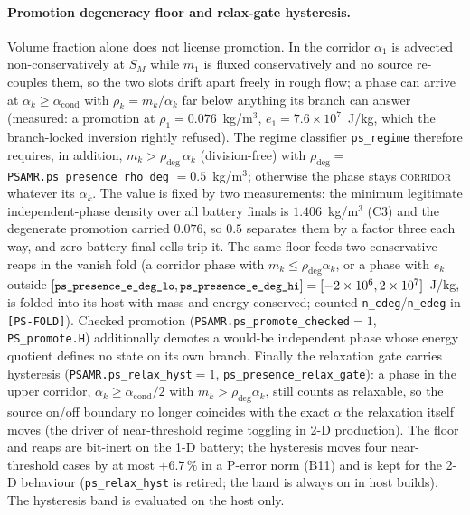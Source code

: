 \documentclass[11pt,a4paper]{article}
\newcommand{\code}[1]{\texttt{\small #1}}
\begin{document}
\paragraph{Promotion degeneracy floor and relax-gate hysteresis.}
Volume fraction alone does not license promotion.  In the corridor
$\alpha_1$ is advected non-conservatively at $S_M$ while $m_1$ is fluxed
conservatively and no source re-couples them, so the two slots drift apart
freely in rough flow; a phase can arrive at $\alpha_k\ge\alpha_{\mathrm{cond}}$
with $\rho_k=m_k/\alpha_k$ far below anything its branch can answer
(measured: a promotion at $\rho_1=0.076$~kg/m$^3$, $e_1=7.6\times10^{7}$~J/kg,
which the branch-locked inversion rightly refused).  The regime classifier
\code{ps\_regime} therefore requires, in addition, $m_k>\rho_{\mathrm{deg}}\,\alpha_k$
(division-free) with $\rho_{\mathrm{deg}}=$ \code{PSAMR.ps\_presence\_rho\_deg}
$=0.5$~kg/m$^3$; otherwise the phase stays \textsc{corridor} whatever its
$\alpha_k$.  The value is fixed by two measurements: the minimum legitimate
independent-phase density over all battery finals is $1.406$~kg/m$^3$ (C3) and
the degenerate promotion carried $0.076$, so $0.5$ separates them by a factor
three each way, and zero battery-final cells trip it.  The same floor feeds
two conservative reaps in the vanish fold (a corridor phase with
$m_k\le\rho_{\mathrm{deg}}\alpha_k$, or a phase with $e_k$ outside
$[\code{ps\_presence\_e\_deg\_lo},\code{ps\_presence\_e\_deg\_hi}]=[-2\times10^{6},2\times10^{7}]$~J/kg,
is folded into its host with mass and energy conserved; counted
\code{n\_cdeg}/\code{n\_edeg} in \code{[PS-FOLD]}).  Checked promotion
(\code{PSAMR.ps\_promote\_checked}$=1$, \code{PS\_promote.H}) additionally
demotes a would-be independent phase whose energy quotient defines no state
on its own branch.  Finally the relaxation gate carries hysteresis
(\code{PSAMR.ps\_relax\_hyst}$=1$, \code{ps\_presence\_relax\_gate}): a phase in
the upper corridor, $\alpha_k\ge\alpha_{\mathrm{cond}}/2$ with
$m_k>\rho_{\mathrm{deg}}\alpha_k$, still counts as relaxable, so the source
on/off boundary no longer coincides with the exact $\alpha$ the relaxation
itself moves (the driver of near-threshold regime toggling in 2-D
production).  The floor and reaps are bit-inert on the 1-D battery; the
hysteresis moves four near-threshold cases by at most $+6.7\,\%$ in a P-error
norm (B11) and is kept for the 2-D behaviour (\code{ps\_relax\_hyst} is
retired; the band is always on in host builds).  The hysteresis band is evaluated on the host only.
\end{document}

